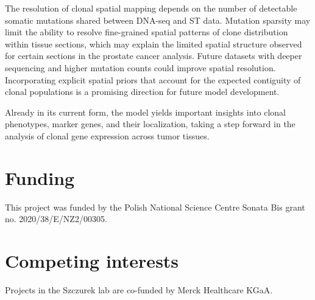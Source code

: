 \documentclass[unnumsec,webpdf,contemporary,large]{oup-authoring-template}%
\theoremstyle{thmstyleone}%
\theoremstyle{thmstyletwo}%
\theoremstyle{thmstylethree}%
\newcommand{\rev}[1]{{\color{revisionblue}#1}}
\begin{document}
\rev{The resolution of clonal spatial mapping depends on the number of detectable somatic mutations shared between DNA-seq and ST data. Mutation sparsity may limit the ability to resolve fine-grained spatial patterns of clone distribution within tissue sections, which may explain the limited spatial structure observed for certain sections in the prostate cancer analysis. Future datasets with deeper sequencing and higher mutation counts could improve spatial resolution. Incorporating explicit spatial priors that account for the expected contiguity of clonal populations is a promising direction for future model development.}

Already in its current form, the model yields important insights into clonal phenotypes, marker genes, and their localization, taking  a step forward in the analysis of clonal gene expression across  tumor tissues.

\section*{Funding}
This project was funded by the Polish National Science Centre Sonata Bis grant no. 2020/38/E/NZ2/00305. 
\section*{Competing interests}
Projects in the Szczurek lab are co-funded by Merck Healthcare KGaA.

%
%
%
%
%
%
%



%




%
%


\newpage
\color{revisionblue}
\setcounter{figure}{0}
\renewcommand{\thefigure}{S\arabic{figure}}
\end{document}
